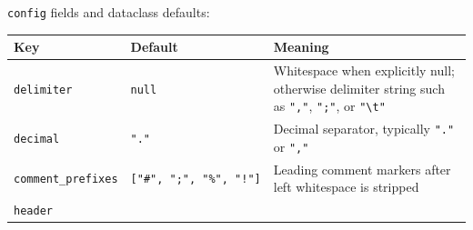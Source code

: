 \documentclass[
  10pt,
  a4paper,
  oneside]{scrreprt}
\begin{document}
\texttt{config} fields and dataclass defaults:

\begin{longtable}[]{@{}lll@{}}
\toprule
\begin{minipage}[b]{0.30\columnwidth}\raggedright
Key\strut
\end{minipage} & \begin{minipage}[b]{0.30\columnwidth}\raggedright
Default\strut
\end{minipage} & \begin{minipage}[b]{0.30\columnwidth}\raggedright
Meaning\strut
\end{minipage}\tabularnewline
\midrule
\endhead
\begin{minipage}[t]{0.30\columnwidth}\raggedright
\texttt{delimiter}\strut
\end{minipage} & \begin{minipage}[t]{0.30\columnwidth}\raggedright
\texttt{null}\strut
\end{minipage} & \begin{minipage}[t]{0.30\columnwidth}\raggedright
Whitespace when explicitly null; otherwise delimiter string such as
\texttt{","}, \texttt{";"}, or \texttt{"\textbackslash{}t"}\strut
\end{minipage}\tabularnewline
\begin{minipage}[t]{0.30\columnwidth}\raggedright
\texttt{decimal}\strut
\end{minipage} & \begin{minipage}[t]{0.30\columnwidth}\raggedright
\texttt{"."}\strut
\end{minipage} & \begin{minipage}[t]{0.30\columnwidth}\raggedright
Decimal separator, typically \texttt{"."} or \texttt{","}\strut
\end{minipage}\tabularnewline
\begin{minipage}[t]{0.30\columnwidth}\raggedright
\texttt{comment\_prefixes}\strut
\end{minipage} & \begin{minipage}[t]{0.30\columnwidth}\raggedright
\texttt{{[}"\#",\ ";",\ "\%",\ "!"{]}}\strut
\end{minipage} & \begin{minipage}[t]{0.30\columnwidth}\raggedright
Leading comment markers after left whitespace is stripped\strut
\end{minipage}\tabularnewline
\begin{minipage}[t]{0.30\columnwidth}\raggedright
\texttt{header}\strut
\end{minipage} & \begin{minipage}[t]{0.30\columnwidth}\raggedright

\end{minipage}
\end{longtable}
\end{document}
